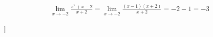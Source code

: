 \begin{ex}
\begin{align}
&\lim_{x\rightarrow -2} \frac{x^2+x-2}{x+2}=\lim_{x\rightarrow -2} \frac{(x-1)(x+2)}{x+2}=-2-1=-3\nonumber
\end{align}
\end{ex}]
